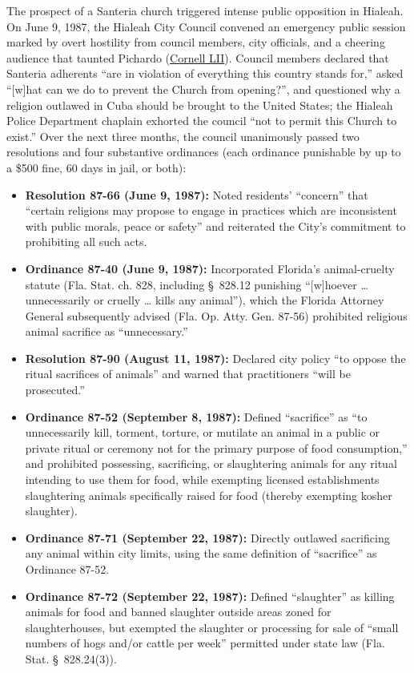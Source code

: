 \documentclass[12pt]{article}
\begin{document}
The prospect of a Santeria church triggered intense public opposition in Hialeah. On June 9, 1987, the Hialeah City Council convened an emergency public session marked by overt hostility from council members, city officials, and a cheering audience that taunted Pichardo (\href{https://www.law.cornell.edu/supct/html/91-948.ZO.html}{Cornell LII}). Council members declared that Santeria adherents ``are in violation of everything this country stands for,'' asked ``[w]hat can we do to prevent the Church from opening?'', and questioned why a religion outlawed in Cuba should be brought to the United States; the Hialeah Police Department chaplain exhorted the council ``not to permit this Church to exist.'' Over the next three months, the council unanimously passed two resolutions and four substantive ordinances (each ordinance punishable by up to a \$500 fine, 60 days in jail, or both):

\begin{itemize}
  \item \textbf{Resolution 87-66 (June 9, 1987):} Noted residents' ``concern'' that ``certain religions may propose to engage in practices which are inconsistent with public morals, peace or safety'' and reiterated the City's commitment to prohibiting all such acts.
  \item \textbf{Ordinance 87-40 (June 9, 1987):} Incorporated Florida's animal-cruelty statute (Fla. Stat. ch. 828, including \S~828.12 punishing ``[w]hoever \dots{} unnecessarily or cruelly \dots{} kills any animal''), which the Florida Attorney General subsequently advised (Fla. Op. Atty. Gen. 87-56) prohibited religious animal sacrifice as ``unnecessary.''
  \item \textbf{Resolution 87-90 (August 11, 1987):} Declared city policy ``to oppose the ritual sacrifices of animals'' and warned that practitioners ``will be prosecuted.''
  \item \textbf{Ordinance 87-52 (September 8, 1987):} Defined ``sacrifice'' as ``to unnecessarily kill, torment, torture, or mutilate an animal in a public or private ritual or ceremony not for the primary purpose of food consumption,'' and prohibited possessing, sacrificing, or slaughtering animals for any ritual intending to use them for food, while exempting licensed establishments slaughtering animals specifically raised for food (thereby exempting kosher slaughter).
  \item \textbf{Ordinance 87-71 (September 22, 1987):} Directly outlawed sacrificing any animal within city limits, using the same definition of ``sacrifice'' as Ordinance 87-52.
  \item \textbf{Ordinance 87-72 (September 22, 1987):} Defined ``slaughter'' as killing animals for food and banned slaughter outside areas zoned for slaughterhouses, but exempted the slaughter or processing for sale of ``small numbers of hogs and/or cattle per week'' permitted under state law (Fla. Stat. \S~828.24(3)).
\end{itemize}
\end{document}
